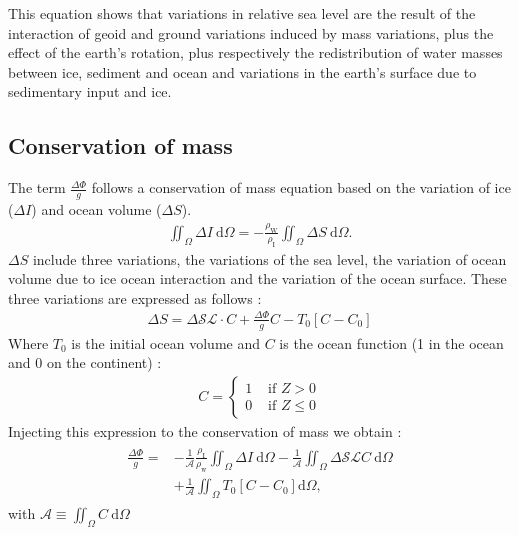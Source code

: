 \documentclass[letterpaper,10pt,english]{sphinxmanual}
\begin{document}
\sphinxAtStartPar
This equation shows that variations in relative sea level are the result of the interaction of geoid and ground variations induced by mass variations, plus the effect of the earth’s rotation, plus respectively the redistribution of water masses between ice, sediment and ocean and variations in the earth’s surface due to sedimentary input and ice.


\subsection{Conservation of mass}
\label{\detokenize{Theory:conservation-of-mass}}
\sphinxAtStartPar
The term \(\frac{\Delta \Phi}{g}\) follows a conservation of mass equation based on the variation of ice (\(\Delta I\)) and ocean volume (\(\Delta S\)).
\begin{equation*}
\begin{split}\iint_{\Omega} \Delta I \mathrm{~d} \Omega=-\frac{\rho_{\mathrm{W}}}{\rho_{\mathrm{I}}} \iint_{\Omega} \Delta S \mathrm{~d} \Omega .\end{split}
\end{equation*}
\sphinxAtStartPar
\(\Delta S\) include three variations, the variations of the sea level, the variation of ocean volume due to ice ocean interaction and the variation of the ocean surface. These three variations are expressed as follows :
\begin{equation*}
\begin{split}\Delta S=\Delta \mathcal{S} \mathcal{L} \cdot C+\frac{\Delta \Phi}{g} C-T_0\left[C-C_0\right]\end{split}
\end{equation*}
\sphinxAtStartPar
Where \(T_0\) is the initial ocean volume and \(C\) is the ocean function (1 in the ocean and 0 on the continent) :
\begin{equation*}
\begin{split}C= \begin{cases}1 & \text { if } Z>0 \\ 0 & \text { if } Z \leq 0\end{cases}\end{split}
\end{equation*}
\sphinxAtStartPar
Injecting this expression to the conservation of mass we obtain :
\begin{equation*}
\begin{split}\begin{aligned}
\frac{\Delta \Phi}{g}= & -\frac{1}{\mathcal{A}} \frac{\rho_{\mathrm{I}}}{\rho_{\mathrm{w}}} \iint_{\Omega} \Delta I \mathrm{~d} \Omega-\frac{1}{\mathcal{A}} \iint_{\Omega} \Delta \mathcal{S} \mathcal{L} C \mathrm{~d} \Omega \\
& +\frac{1}{\mathcal{A}} \iint_{\Omega} T_0\left[C-C_0\right] \mathrm{d} \Omega,
\end{aligned}\end{split}
\end{equation*}
\sphinxAtStartPar
with \(\mathcal{A} \equiv \iint_{\Omega} C \mathrm{~d} \Omega\)
\end{document}
